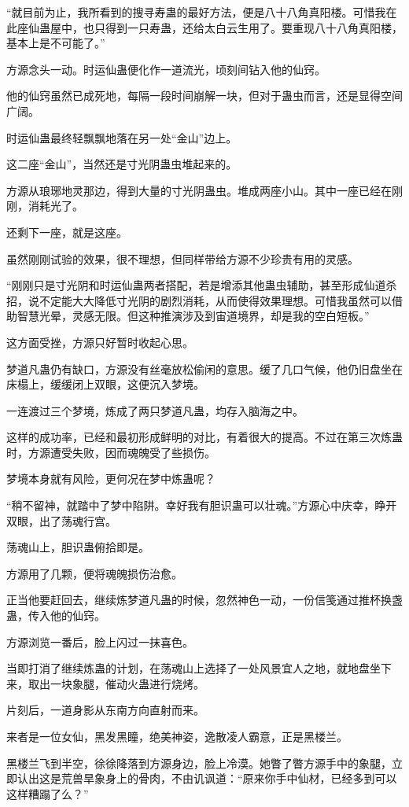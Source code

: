 \begin{this_body}
“就目前为止，我所看到的搜寻寿蛊的最好方法，便是八十八角真阳楼。可惜我在此座仙蛊屋中，也只得到一只寿蛊，还给太白云生用了。要重现八十八角真阳楼，基本上是不可能了。”

方源念头一动。时运仙蛊便化作一道流光，顷刻间钻入他的仙窍。

他的仙窍虽然已成死地，每隔一段时间崩解一块，但对于蛊虫而言，还是显得空间广阔。

时运仙蛊最终轻飘飘地落在另一处“金山”边上。

这二座“金山”，当然还是寸光阴蛊虫堆起来的。

方源从琅琊地灵那边，得到大量的寸光阴蛊虫。堆成两座小山。其中一座已经在刚刚，消耗光了。

还剩下一座，就是这座。

虽然刚刚试验的效果，很不理想，但同样带给方源不少珍贵有用的灵感。

“刚刚只是寸光阴和时运仙蛊两者搭配，若是增添其他蛊虫辅助，甚至形成仙道杀招，说不定能大大降低寸光阴的剧烈消耗，从而使得效果理想。可惜我虽然可以借助智慧光晕，灵感无限。但这种推演涉及到宙道境界，却是我的空白短板。”

这方面受挫，方源只好暂时收起心思。

梦道凡蛊仍有缺口，方源没有丝毫放松偷闲的意思。缓了几口气候，他仍旧盘坐在床榻上，缓缓闭上双眼，这便沉入梦境。

一连渡过三个梦境，炼成了两只梦道凡蛊，均存入脑海之中。

这样的成功率，已经和最初形成鲜明的对比，有着很大的提高。不过在第三次炼蛊时，方源遭受失败，因而魂魄受了些损伤。

梦境本身就有风险，更何况在梦中炼蛊呢？

“稍不留神，就踏中了梦中陷阱。幸好我有胆识蛊可以壮魂。”方源心中庆幸，睁开双眼，出了荡魂行宫。

荡魂山上，胆识蛊俯拾即是。

方源用了几颗，便将魂魄损伤治愈。

正当他要赶回去，继续炼梦道凡蛊的时候，忽然神色一动，一份信笺通过推杯换盏蛊，传入他的仙窍。

方源浏览一番后，脸上闪过一抹喜色。

当即打消了继续炼蛊的计划，在荡魂山上选择了一处风景宜人之地，就地盘坐下来，取出一块象腿，催动火蛊进行烧烤。

片刻后，一道身影从东南方向直射而来。

来者是一位女仙，黑发黑瞳，绝美神姿，逸散凌人霸意，正是黑楼兰。

黑楼兰飞到半空，徐徐降落到方源身边，脸上冷漠。她瞥了瞥方源手中的象腿，立即认出这是荒兽旱象身上的骨肉，不由讥讽道：“原来你手中仙材，已经多到可以这样糟蹋了么？”


\end{this_body}
